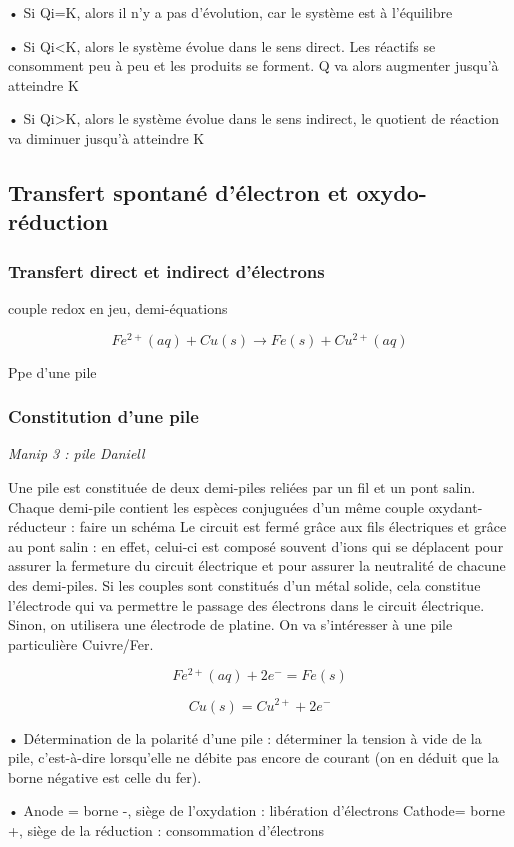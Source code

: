 \documentclass{article}%
\begin{document}
• Si Qi=K, alors il n’y a pas d’évolution, car le système est à l’équilibre

• Si Qi<K, alors le système évolue dans le sens direct. Les réactifs se consomment peu à peu
et les produits se forment. Q va alors augmenter jusqu’à atteindre K

• Si Qi>K, alors le système évolue dans le sens indirect, le quotient de réaction va diminuer
jusqu’à atteindre K

\subsection{Transfert spontané d'électron et oxydo-réduction}
\subsubsection{Transfert direct et indirect d'électrons}
couple redox en jeu, demi-équations

\[Fe^{2+}(aq) + Cu(s) \rightarrow Fe(s) +Cu^{2+}(aq)\]

Ppe d'une pile

\subsubsection{Constitution d'une pile}
\textit{Manip 3 : pile Daniell}

Une pile est constituée de deux demi-piles reliées par un fil et un pont salin. Chaque demi-pile
contient les espèces conjuguées d’un même couple oxydant-réducteur : faire un schéma
Le circuit est fermé grâce aux fils électriques et grâce au pont salin : en effet, celui-ci est composé
souvent d’ions qui se déplacent pour assurer la fermeture du circuit électrique et pour assurer la
neutralité de chacune des demi-piles.
Si les couples sont constitués d’un métal solide, cela constitue l’électrode qui va permettre le
passage des électrons dans le circuit électrique. Sinon, on utilisera une électrode de platine.
On va s’intéresser à une pile particulière Cuivre/Fer.

\[Fe^{2+}(aq) + 2e^{-} = Fe(s)\]

\[Cu(s) = Cu^{2+} + 2e^{-}\]

• Détermination de la polarité d’une pile : déterminer la tension à vide de la pile, c’est-à-dire
lorsqu’elle ne débite pas encore de courant (on en déduit que la borne négative est celle du
fer).

• Anode = borne -, siège de l’oxydation : libération d’électrons
Cathode= borne +, siège de la réduction : consommation d’électrons
\end{document}
